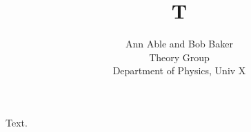 \documentclass{article}
\begin{document}
\title{T}
\author{Ann Able and Bob Baker\\ Theory Group\\ Department of Physics, Univ X}
\maketitle
Text.
\end{document}
